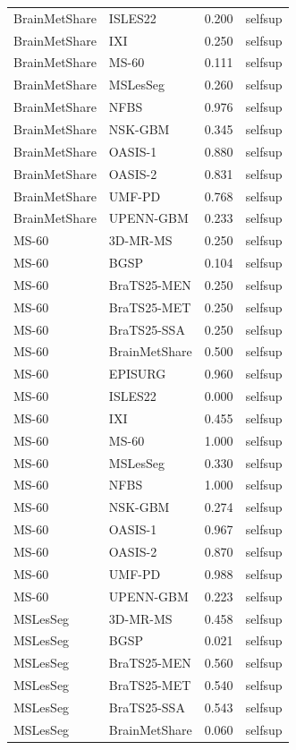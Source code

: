 \begin{tabular}{llrl}
BrainMetShare & ISLES22 & 0.200 & selfsup \\
BrainMetShare & IXI & 0.250 & selfsup \\
BrainMetShare & MS-60 & 0.111 & selfsup \\
BrainMetShare & MSLesSeg & 0.260 & selfsup \\
BrainMetShare & NFBS & 0.976 & selfsup \\
BrainMetShare & NSK-GBM & 0.345 & selfsup \\
BrainMetShare & OASIS-1 & 0.880 & selfsup \\
BrainMetShare & OASIS-2 & 0.831 & selfsup \\
BrainMetShare & UMF-PD & 0.768 & selfsup \\
BrainMetShare & UPENN-GBM & 0.233 & selfsup \\
MS-60 & 3D-MR-MS & 0.250 & selfsup \\
MS-60 & BGSP & 0.104 & selfsup \\
MS-60 & BraTS25-MEN & 0.250 & selfsup \\
MS-60 & BraTS25-MET & 0.250 & selfsup \\
MS-60 & BraTS25-SSA & 0.250 & selfsup \\
MS-60 & BrainMetShare & 0.500 & selfsup \\
MS-60 & EPISURG & 0.960 & selfsup \\
MS-60 & ISLES22 & 0.000 & selfsup \\
MS-60 & IXI & 0.455 & selfsup \\
MS-60 & MS-60 & 1.000 & selfsup \\
MS-60 & MSLesSeg & 0.330 & selfsup \\
MS-60 & NFBS & 1.000 & selfsup \\
MS-60 & NSK-GBM & 0.274 & selfsup \\
MS-60 & OASIS-1 & 0.967 & selfsup \\
MS-60 & OASIS-2 & 0.870 & selfsup \\
MS-60 & UMF-PD & 0.988 & selfsup \\
MS-60 & UPENN-GBM & 0.223 & selfsup \\
MSLesSeg & 3D-MR-MS & 0.458 & selfsup \\
MSLesSeg & BGSP & 0.021 & selfsup \\
MSLesSeg & BraTS25-MEN & 0.560 & selfsup \\
MSLesSeg & BraTS25-MET & 0.540 & selfsup \\
MSLesSeg & BraTS25-SSA & 0.543 & selfsup \\
MSLesSeg & BrainMetShare & 0.060 & selfsup \\

\end{tabular}
